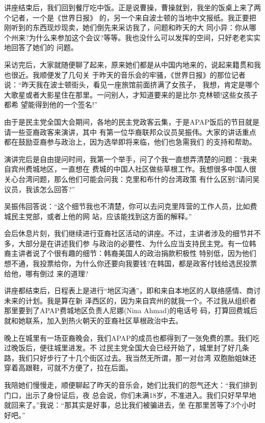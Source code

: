 ﻿\documentclass[11pt]{article}
\begin{document}
讲座结束后，我们回到餐厅吃中饭。正是说曹操，曹操就到，我坐的饭桌上来了两个记者，一个是《世界日报》
的，另一个来自波士顿的当地中文报纸。我正要把刚听到的东西现炒现卖，她们倒先来采访我了，问题和昨天的大
同小异：你从哪个州来?为什么来参加这个会议?等等。我也没什么可以发挥的空间，只好老老实实地回答了她们的
问题。

采访完后，大家就随便聊了起来，原来她们都是从中国内地来的，说起来籍贯和我也很近。我顺便发了几句关
于昨天的音乐会的牢骚，《世界日报》的那位记者说：``昨天我在波士顿街头，看见一座旅馆前面挤满了女孩子，
我想，肯定是哪个大歌星或者大影星住在那里。一问别人，才知道要来的是比尔$\cdot$克林顿!这些女孩子都希
望能得到他的一个签名!''

由于是民主党全国大会期间，各地的民主党政客云集，于是APAP饭后的节目就是请一些亚裔政客来演讲，其中
有第一位华裔联邦众议员吴振伟。大家的讲话重点都在鼓励亚裔参与政治上，因为选举即将来临，他们也急需我们
的支持和帮助。

演讲完后是自由提问时间，我第一个举手，问了个我一直想弄清楚的问题：``我来自宾州费城地区，一直想在
费城的中国人社区做些草根工作。我想很多中国人很关心台湾问题，那么他们可能会问我：克里和布什的台湾政策
有什么区别?请问吴议员，我该怎么回答?''

吴振伟回答说：``这个细节我也不清楚，你可以去问克里阵营的工作人员，比如费城民主党部，或者上他的网
站，应该能找到这方面的解释。''

会后休息片刻，我们继续进行亚裔社区活动的讲座。不过，主讲者涉及的细节并不多，大部分是在讲述我们参
与政治的必要性、为什么应当支持民主党。有一位韩裔主讲者说了个很有趣的细节：韩裔美国人的政治捐款积极性
特别低，因为他们想不通，我投票给你，为什么你还要向我要钱?在韩国，都是政客付钱给选民投票给他，哪有倒过
来的道理?

讲座都结束后，日程表上是进行``地区沟通''，即和来自本地区的人联络感情、商讨未来的计划。我是算在新
泽西区的，因为来自宾州的就我一个。不过我从组织者那里要到了APAP费城地区负责人尼娜(Nina Ahmad)的电话号
码，打算回费城后就和她联系，加入到热火朝天的亚裔社区草根政治中去。

晚上在城里有一场亚裔晚会，我们APAP的成员也都得到了一张免费的票。我们吃过晚饭后，便往城里进发。不
过民主党全国大会已经开始了，城里封了好几条路，我们只好步行了十几个街区过去。我当然无所谓，那一对台湾
双胞胎姐妹还穿着高跟鞋，可就不方便了，拉在后面。

我陪她们慢慢走，顺便聊起了昨天的音乐会，她们比我们的怨气还大：``我们排到门口，出示了身份证后，夜
总会说，你们未满18岁，不准进入。我们只好早早地就回来了。''我说：``那其实是好事，总比我们被骗进去，坐
在那里苦等了3个小时好吧。''
\end{document}
